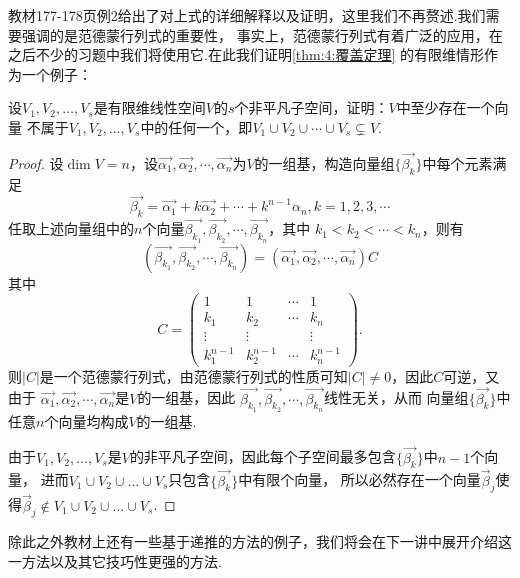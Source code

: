 教材177-178页例2给出了对上式的详细解释以及证明，这里我们不再赘述.我们需要强调的是范德蒙行列式的重要性，
事实上，范德蒙行列式有着广泛的应用，在之后不少的习题中我们将使用它.在此我们证明\autoref{thm:4:覆盖定理}
的有限维情形作为一个例子：
\begin{example}\label{ex:11:行列式证明覆盖定理}
    设$V_1,V_2,\ldots,V_s$是有限维线性空间$V$的$s$个非平凡子空间，证明：$V$中至少存在一个向量
    不属于$V_1,V_2,\ldots,V_s$中的任何一个，即$V_1 \cup V_2 \cup \cdots \cup V_s\subsetneq V.$
\end{example}
\begin{proof}
    设$\dim V=n$，设$\vec{\alpha_1},\vec{\alpha_2},\cdots,\vec{\alpha_n}$为$V$的一组基，构造向量组$\{\vec{\beta_k}\}$中每个元素满足
    \[\vec{\beta_k}=\vec{\alpha_1}+k\vec{\alpha_2}+\cdots+k^{n-1}\alpha_n,k=1,2,3,\cdots\]
    任取上述向量组中的$n$个向量$\vec{\beta_{k_1}},\vec{\beta_{k_2}},\cdots,\vec{\beta_{k_n}}$，其中
    $k_1<k_2<\cdots<k_n$，则有
    \[(\vec{\beta_{k_1}},\vec{\beta_{k_2}},\cdots,\vec{\beta_{k_n}})=(\vec{\alpha_1},\vec{\alpha_2},\cdots,\vec{\alpha_n})C\]
    其中
    \[C=\begin{pmatrix}
        1 & 1 & \cdots & 1 \\
        k_1 & k_2 & \cdots & k_n \\
        \vdots & \vdots &  & \vdots \\
        k_1^{n-1} & k_2^{n-1} & \cdots & k_n^{n-1}
    \end{pmatrix}.\]
    则$|C|$是一个范德蒙行列式，由范德蒙行列式的性质可知$|C| \neq 0$，因此$C$可逆，又由于
    $\vec{\alpha_1},\vec{\alpha_2},\cdots,\vec{\alpha_n}$是$V$的一组基，因此
    $\vec{\beta_{k_1}},\vec{\beta_{k_2}},\cdots,\vec{\beta_{k_n}}$线性无关，从而
    向量组$\{\vec{\beta_k}\}$中任意$n$个向量均构成$V$的一组基.

    由于$V_1,V_2,\ldots,V_s$是$V$的非平凡子空间，因此每个子空间最多包含$\{\vec{\beta_k}\}$中$n-1$个向量，
    进而$V_1\cup V_2\cup\ldots\cup V_s$只包含$\{\vec{\beta_k}\}$中有限个向量，
    所以必然存在一个向量$\vec{\beta}_j$使得$\vec{\beta}_j \notin V_1\cup V_2\cup\ldots\cup V_s$.
\end{proof}

除此之外教材上还有一些基于递推的方法的例子，我们将会在下一讲中展开介绍这一方法以及其它技巧性更强的方法.

